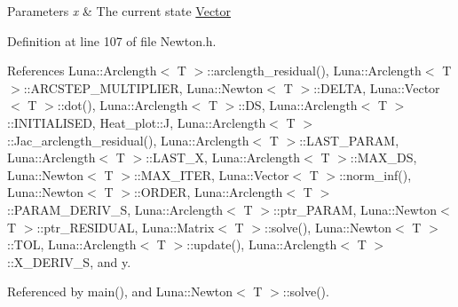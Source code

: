 \begin{DoxyParams}{Parameters}
{\em x} & The current state \hyperlink{classLuna_1_1Vector}{Vector} \\
\hline
\end{DoxyParams}


Definition at line 107 of file Newton.\+h.



References Luna\+::\+Arclength$<$ T $>$\+::arclength\+\_\+residual(), Luna\+::\+Arclength$<$ T $>$\+::\+A\+R\+C\+S\+T\+E\+P\+\_\+\+M\+U\+L\+T\+I\+P\+L\+I\+ER, Luna\+::\+Newton$<$ T $>$\+::\+D\+E\+L\+TA, Luna\+::\+Vector$<$ T $>$\+::dot(), Luna\+::\+Arclength$<$ T $>$\+::\+DS, Luna\+::\+Arclength$<$ T $>$\+::\+I\+N\+I\+T\+I\+A\+L\+I\+S\+ED, Heat\+\_\+plot\+::J, Luna\+::\+Arclength$<$ T $>$\+::\+Jac\+\_\+arclength\+\_\+residual(), Luna\+::\+Arclength$<$ T $>$\+::\+L\+A\+S\+T\+\_\+\+P\+A\+R\+AM, Luna\+::\+Arclength$<$ T $>$\+::\+L\+A\+S\+T\+\_\+X, Luna\+::\+Arclength$<$ T $>$\+::\+M\+A\+X\+\_\+\+DS, Luna\+::\+Newton$<$ T $>$\+::\+M\+A\+X\+\_\+\+I\+T\+ER, Luna\+::\+Vector$<$ T $>$\+::norm\+\_\+inf(), Luna\+::\+Newton$<$ T $>$\+::\+O\+R\+D\+ER, Luna\+::\+Arclength$<$ T $>$\+::\+P\+A\+R\+A\+M\+\_\+\+D\+E\+R\+I\+V\+\_\+S, Luna\+::\+Arclength$<$ T $>$\+::ptr\+\_\+\+P\+A\+R\+AM, Luna\+::\+Newton$<$ T $>$\+::ptr\+\_\+\+R\+E\+S\+I\+D\+U\+AL, Luna\+::\+Matrix$<$ T $>$\+::solve(), Luna\+::\+Newton$<$ T $>$\+::\+T\+OL, Luna\+::\+Arclength$<$ T $>$\+::update(), Luna\+::\+Arclength$<$ T $>$\+::\+X\+\_\+\+D\+E\+R\+I\+V\+\_\+S, and y.



Referenced by main(), and Luna\+::\+Newton$<$ T $>$\+::solve().


